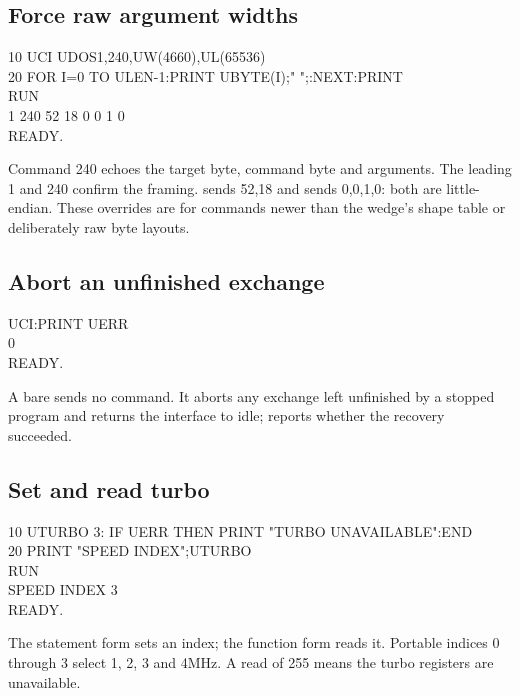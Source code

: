 
\subsection*{Force raw argument widths}

\begin{screen}
10 UCI UDOS1,240,UW(4660),UL(65536)\\
20 FOR I=0 TO ULEN-1:PRINT UBYTE(I);" ";:NEXT:PRINT\\
RUN\\
1 240 52 18 0 0 1 0\\
READY.
\end{screen}

Command 240 echoes the target byte, command byte and arguments. The leading
1 and 240 confirm the framing.  sends 52,18 and
 sends 0,0,1,0: both are little-endian. These overrides are for
commands newer than the wedge's shape table or deliberately raw byte layouts.

\subsection*{Abort an unfinished exchange}

\begin{screen}
UCI:PRINT UERR\\
0\\
READY.
\end{screen}

A bare  sends no command. It aborts any exchange left unfinished by a
stopped program and returns the interface to idle;  reports whether
the recovery succeeded.

\subsection*{Set and read turbo}

\begin{screen}
10 UTURBO 3: IF UERR THEN PRINT "TURBO UNAVAILABLE":END\\
20 PRINT "SPEED INDEX";UTURBO\\
RUN\\
SPEED INDEX 3\\
READY.
\end{screen}

The statement form sets an index; the function form reads it. Portable indices
0 through 3 select 1, 2, 3 and 4MHz. A read of 255 means the turbo registers are
unavailable.


